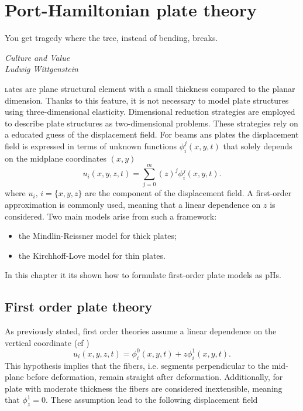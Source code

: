 \chapter{Port-Hamiltonian plate theory}

\epigraph{You get tragedy where the tree, instead of bending, breaks.}{\textit{Culture and Value\\
Ludwig Wittgenstein}}
\minitoc

\lettrine{\color{theme}{P}}lates are plane structural element with a small thickness compared to the planar dimension. Thanks to this feature, it is not necessary to model plate structures using three-dimensional elasticity. Dimensional reduction strategies are employed to describe plate structures as two-dimensional problems. These strategies rely on a educated guess of the displacement field. For beams ans plates the displacement field is expressed in terms of unknown functions $\phi_i^j(x,y,t)$ that solely depends on the midplane coordinates $(x,y)$
\begin{equation*}
u_i(x,y,z,t) = \sum_{j=0}^m (z)^j \phi_i^j(x,y,t).
\end{equation*}
where $u_{i}, \, i = \{x, y, z\}$ are the component of the displacement field. A first-order approximation is commonly used, meaning that a linear dependence on $z$ is considered. Two main models arise from such a framework: 
\begin{itemize}
	\item the Mindlin-Reissner model for thick plates;
	\item the Kirchhoff-Love model for thin plates.
\end{itemize}

In this chapter it its shown how to formulate first-order plate models as pHs. 

\section{First order plate theory}
As previously stated, first order theories assume a linear dependence on the vertical coordinate (cf \cite{reddy2006theory})
\begin{equation*}
u_i(x,y,z,t) = \phi_i^0(x,y,t) + z \phi_i^1(x,y,t).
\end{equation*}
This hypothesis implies that the fibers, i.e. segments perpendicular to the mid-plane before deformation, remain straight after deformation. Additionally, for plate with moderate thickness the fibers are considered inextensible, meaning that $\phi_z^1 = 0$. These assumption lead to the following displacement field

